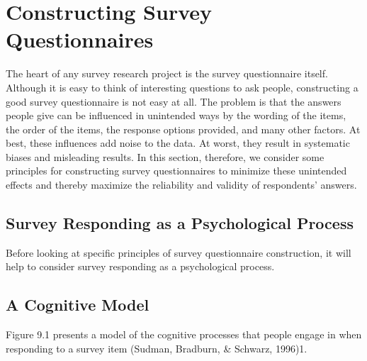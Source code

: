 \newpage
\section{Constructing Survey Questionnaires}


The heart of any survey research project is the survey questionnaire itself. Although it is easy to think of interesting questions to ask people, constructing a good survey questionnaire is not easy at all. The problem is that the answers people give can be influenced in unintended ways by the wording of the items, the order of the items, the response options provided, and many other factors. At best, these influences add noise to the data. At worst, they result in systematic biases and misleading results. In this section, therefore, we consider some principles for constructing survey questionnaires to minimize these unintended effects and thereby maximize the reliability and validity of respondents’ answers.

\subsection{Survey Responding as a Psychological Process}

Before looking at specific principles of survey questionnaire construction, it will help to consider survey responding as a psychological process.

\subsection{A Cognitive Model}

Figure 9.1 presents a model of the cognitive processes that people engage in when responding to a survey item (Sudman, Bradburn, \& Schwarz, 1996)1. 

